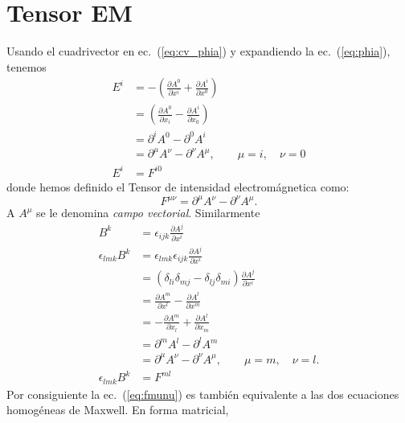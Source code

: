 \section{Tensor EM}


Usando el cuadrivector en ec.~(\ref{eq:cv_phia}) y
expandiendo la ec.~(\ref{eq:phia}), tenemos
\begin{align}
  E^i&=-(\frac{\partial A^0}{\partial x^{i}}+\frac{\partial A^{i}}{\partial x^0})\nonumber\\
  &=(\frac{\partial A^0}{\partial x_i}-\frac{\partial A^{i}}{\partial x_0})\nonumber\\
  &=\partial^{i}A^0-\partial^0 A^{i}\nonumber\\
  \label{eq:Efmunu}
  &=\partial^\mu A^\nu-\partial^\nu A^\mu,
  \qquad 
  \mu=i,\quad \nu=0\\
  \label{eq:E_Fi0} %
  E^{i}&=F^{i0}
\end{align}
donde hemos definido el Tensor de intensidad electrom\'agnetica como:
\begin{equation}
  \label{eq:fmunu}
    F^{\mu\nu}=\partial^\mu A^\nu-\partial^\nu A^\mu.
\end{equation}
A $A^\mu$ se le denomina \emph{campo vectorial}. Similarmente
\begin{align}
  B^k&=\epsilon_{ijk}\frac{\partial A^j}{\partial x^{i}}\nonumber\\
  \epsilon_{lmk}B^k&=\epsilon_{lmk}\epsilon_{ijk}\frac{\partial A^j}{\partial x^{i}}\nonumber\\
  &=(\delta_{li}\delta_{mj}-\delta_{lj}\delta_{mi})\frac{\partial A^j}{\partial x^{i}}\nonumber\\
  &=\frac{\partial A^m}{\partial x^l}-\frac{\partial A^l}{\partial x^m}\nonumber\\
  &=-\frac{\partial A^m}{\partial x_l}+\frac{\partial A^l}{\partial x_m}\nonumber\\
  &=\partial^m A^l-\partial^l A^m\nonumber\\
  \label{eq:Bfmunu}
  &=\partial^\mu A^\nu-\partial^\nu A^\mu,
  \qquad 
  \mu=m,\quad \nu=l.\\
  \label{eq:BFij}
\epsilon_{lmk}B^k&=F^{ml}
\end{align}
Por consiguiente la ec.~(\ref{eq:fmunu}) es tambi\'en equivalente a las
dos ecuaciones homog\'eneas de Maxwell. En forma matricial,
